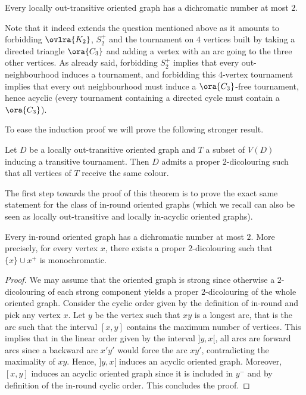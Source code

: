 \begin{theorem}\label{thm:2dic}
Every locally out-transitive oriented graph has a dichromatic number at most $2$.
\end{theorem}


Note that it indeed extends the question mentioned above as it amounts to forbidding $\ovlra{K_2}$, $S^+_2$ and the tournament on $4$ vertices built by taking a directed triangle $\ora{C_{3}}$ and adding a vertex with an arc going to the three other vertices. As already said, forbidding $S^+_2$ implies that every out-neighbourhood induces a tournament, and forbidding this 4-vertex tournament implies that every out neighbourhood must induce a $\ora{C_3}$-free tournament, hence acyclic (every tournament containing a directed cycle must contain a $\ora{C_3}$).



To ease the induction proof we will prove the following stronger result. 

\begin{theorem}\label{thm:main}
Let $D$ be a locally out-transitive oriented graph and $T$ a subset of $V(D)$ inducing a transitive tournament. Then $D$ admits a proper $2$-dicolouring such that all vertices of $T$ receive the same colour.
\end{theorem}

The first step towards the proof of this theorem is to prove the exact same statement for the class of in-round oriented graphs (which we recall can also be seen as locally out-transitive and locally in-acyclic oriented graphs).
\begin{proposition}\label{prop:colin-round}
Every in-round oriented graph has a dichromatic number at most $2$. More precisely, for every vertex $x$, there exists a proper $2$-dicolouring such that $\{x\}\cup x^{+}$ is monochromatic.
\end{proposition}
\begin{proof}
We may assume that the oriented graph is strong since otherwise a $2$-dicolouring of each strong component yields a proper $2$-dicolouring of the whole oriented graph. 
Consider the cyclic order given by the definition of in-round and pick any vertex $x$. Let $y$ be the vertex such that $xy$ is a longest arc, that is the arc such that the interval $[x,y]$ contains the maximum number of vertices. 
This implies that in the linear order given by the interval $]y,x[$, all arcs are forward arcs since a backward arc $x'y'$ would force the arc $xy'$, contradicting the maximality of $xy$. Hence, $]y,x[$ induces an acyclic oriented graph. 
Moreover, $[x,y]$ induces an acyclic oriented graph since it is included in $y^{-}$ and by definition of the in-round cyclic order. This concludes the proof.
\end{proof}



